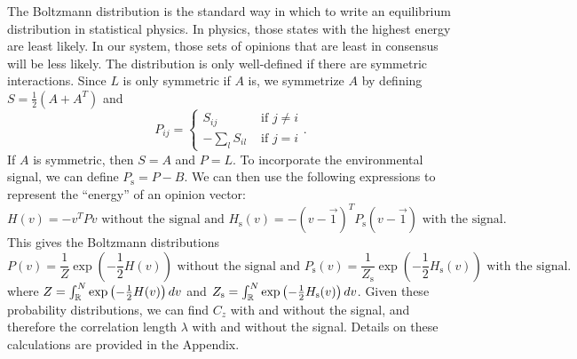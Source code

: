 \documentclass{article}
\begin{document}
The Boltzmann distribution is the standard way in which to write an equilibrium distribution in statistical physics. In physics, those states with the highest energy are least likely. In our system, those sets of opinions that are least in consensus will be less likely. The distribution is only well-defined if there are symmetric interactions. Since $L$ is only symmetric if $A$ is, we symmetrize $A$ by defining $S=\frac{1}{2}(A+A^T)$ and 
\begin{equation*}
P_{ij}=\left\{\begin{array}{ll} S_{ij} & \text{ if $j\neq i$}
\\ -\sum_lS_{il} & \text{ if $j=i$}
\end{array}\right..
\end{equation*}
If $A$ is symmetric, then $S=A$ and $P=L$. To incorporate the environmental signal, we can define $P_\text{s}=P-B$.
We can then use the following expressions to represent the ``energy'' of an opinion vector:
$H(v)=-v^TPv \text{ without the signal and } H_\text{s}(v)=-(v-\vec{1})^TP_\text{s}(v-\vec{1}) \text{ with the signal. }$%
This gives the Boltzmann distributions
\begin{equation*}
P(v)=\frac{1}{Z}\exp\left(-\frac{1}{2}H(v)\right) \text{ without the signal and } P_\text{s}(v)=\frac{1}{Z_\text{s}}\exp\left(-\frac{1}{2}H_\text{s}(v)\right) \text{ with the signal. }\label{Boltzmann}
\end{equation*}
where $Z=\int_{\mathbb{R}}^N\exp\left(-\frac{1}{2}H(v)\right)dv$ and $Z_\text{s}=\int_{\mathbb{R}}^N\exp\left(-\frac{1}{2}H_\text{s}(v)\right)dv$. Given these probability distributions, we can find $C_z$ with and without the signal, and therefore the correlation length $\lambda$ with and without the signal. Details on these calculations are provided in the Appendix.
\end{document}

